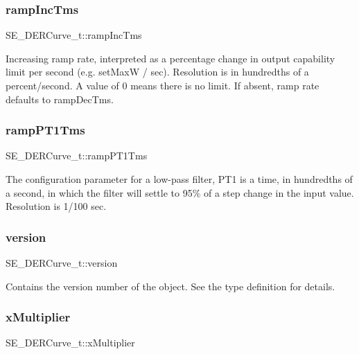 \subsubsection{\texorpdfstring{ramp\+Inc\+Tms}{rampIncTms}}
{\footnotesize\ttfamily S\+E\+\_\+\+D\+E\+R\+Curve\+\_\+t\+::ramp\+Inc\+Tms}

Increasing ramp rate, interpreted as a percentage change in output capability limit per second (e.\+g. set\+MaxW / sec). Resolution is in hundredths of a percent/second. A value of 0 means there is no limit. If absent, ramp rate defaults to ramp\+Dec\+Tms. \mbox{\label{group__DERCurve_gac3e2d656269ffc0cb1ba8e642f6893b4}} 
\subsubsection{\texorpdfstring{ramp\+P\+T1\+Tms}{rampPT1Tms}}
{\footnotesize\ttfamily S\+E\+\_\+\+D\+E\+R\+Curve\+\_\+t\+::ramp\+P\+T1\+Tms}

The configuration parameter for a low-\/pass filter, P\+T1 is a time, in hundredths of a second, in which the filter will settle to 95\% of a step change in the input value. Resolution is 1/100 sec. \mbox{\label{group__DERCurve_gaa0cda98a583e9f6fa1ec89ce6091c496}} 
\subsubsection{\texorpdfstring{version}{version}}
{\footnotesize\ttfamily S\+E\+\_\+\+D\+E\+R\+Curve\+\_\+t\+::version}

Contains the version number of the object. See the type definition for details. \mbox{\label{group__DERCurve_ga143077494db6c432ae52adafa1a3c825}} 
\subsubsection{\texorpdfstring{x\+Multiplier}{xMultiplier}}
{\footnotesize\ttfamily S\+E\+\_\+\+D\+E\+R\+Curve\+\_\+t\+::x\+Multiplier}

